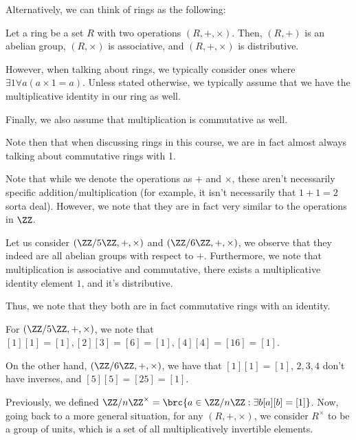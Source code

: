 \documentclass[openany]{book}
\begin{document}
Alternatively, we can think of rings as the following:
\begin{defn}
	Let a ring be a set $R$ with two operations $(R, +, \times)$. Then, $(R, +)$ is an abelian group, $(R, \times)$ is associative, and $(R, +, \times)$ is distributive.
\end{defn}

However, when talking about rings, we typically consider ones where $\exists 1 \forall a (a \times 1 = a)$. Unless stated otherwise, we typically assume that we have the multiplicative identity in our ring as well.

Finally, we also assume that multiplication is commutative as well.

Note then that when discussing rings in this course, we are in fact almost always talking about commutative rings with 1.

\begin{rmk}
	Note that while we denote the operations as $+$ and $\times$, these aren't necessarily specific addition/multiplication (for example, it isn't necessarily that $1+1 = 2$ sorta deal). However, we note that they are in fact very similar to the operations in $\ZZ$.
\end{rmk}

\begin{example}
	Let us consider $(\ZZ/5\ZZ, +, \times)$ and $(\ZZ/6\ZZ, +, \times)$, we observe that they indeed are all abelian groups with respect to $+$. Furthermore, we note that multiplication is associative and commutative, there exists a multiplicative identity element $1$, and it's distributive.
	
	Thus, we note that they both are in fact commutative rings with an identity.
\end{example}

\begin{example}[Fields]
	For $(\ZZ/5\ZZ, +, \times)$, we note that $[1][1] = [1], [2][3]=[6]=[1], [4][4] = [16] = [1]$.
	
	On the other hand, $(\ZZ/6\ZZ, +, \times)$, we have that $[1][1] = [1]$, $2,3,4$ don't have inverses, and $[5][5] = [25] = [1]$.
\end{example}

Previously, we defined $\ZZ/n\ZZ^{\times} = \brc{a \in \ZZ/n\ZZ : \exists b [a][b] = [1]}$. Now, going back to a more general situation, for any $(R, +, \times)$, we consider $R^{\times}$ to be a group of units, which is a set of all multiplicatively invertible elements.
\end{document}
